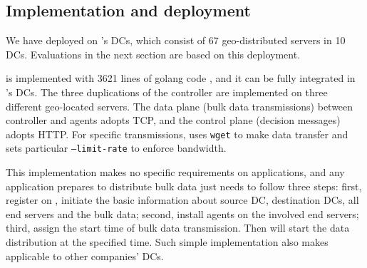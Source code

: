 \subsection{Implementation and deployment}
\label{sec:deployment}


We have deployed \name on \company's DCs, which consist of 67 geo-distributed servers in 10 DCs. Evaluations in the next section are based on this deployment. %

\name is implemented with 3621 lines of golang code \cite{golang}, and it can be fully integrated in \company's DCs. The three duplications of the controller are implemented on three different geo-located servers. The data plane (bulk data transmissions) between controller and agents adopts TCP, and the control plane (decision messages) adopts HTTP. For specific transmissions, \name uses \texttt{wget} to make data transfer and sets particular \texttt{--limit-rate} to enforce bandwidth. %

This implementation makes no specific requirements on applications, and any application prepares to distribute bulk data just needs to follow three steps: first, register on \name, initiate the basic information about source DC, destination DCs, all end servers and the bulk data; second, install agents on the involved end servers; third, assign the start time of bulk data transmission. Then \name will start the data distribution at the specified time. Such simple implementation also makes \name applicable to other companies' DCs. 	






%
%
%
%
%

